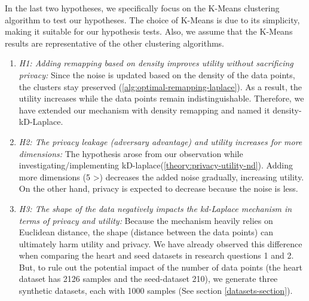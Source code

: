 \begin{enumerate}
        In the last two hypotheses, we specifically focus on the K-Means clustering algorithm to test our hypotheses.
        The choice of K-Means is due to its simplicity, making it suitable for our hypothesis tests.
        Also, we assume that the K-Means results are representative of the other clustering algorithms.
        \begin{enumerate}
          \item \textit{H1: Adding remapping based on density improves utility without sacrificing privacy:}
                Since the noise is updated based on the density of the data points, the clusters stay preserved (\ref{alg:optimal-remapping-laplace}).
                As a result, the utility increases while the data points remain indistinguishable.
                Therefore, we have extended our mechanism with density remapping and named it density-kD-Laplace.
          \item \textit{H2: The privacy leakage (adversary advantage) and utility increases for more dimensions:}
                The hypothesis arose from our observation while investigating/implementing kD-laplace(\ref{theory:privacy-utility-nd}).
                Adding more dimensions (5 >) decreases the added noise gradually, increasing utility.
                On the other hand, privacy is expected to decrease because the noise is less.
          \item \textit{H3: The shape of the data negatively impacts the kd-Laplace mechanism in terms of privacy and utility:}
                Because the mechanism heavily relies on Euclidean distance, the shape (distance between the data points) can ultimately harm utility and privacy.
                We have already observed this difference when comparing the heart and seed datasets in research questions 1 and 2.
                But, to rule out the potential impact of the number of data points (the heart dataset has 2126 samples and the seed-dataset 210), we generate three synthetic datasets, each with 1000 samples (See section \ref{datasets-section}).
        \end{enumerate}
\end{enumerate}

